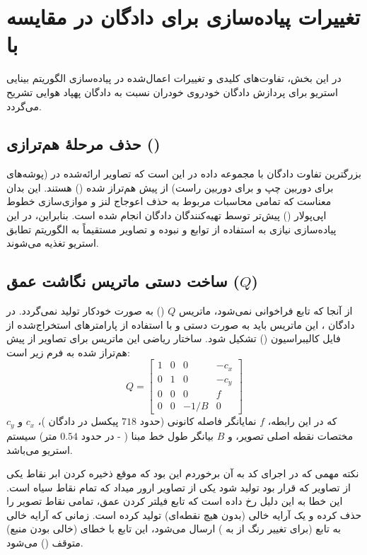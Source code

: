 \documentclass[12pt,a4paper]{article}
\begin{document}
\section{تغییرات پیاده‌سازی برای دادگان  در مقایسه با }	در این بخش، تفاوت‌های کلیدی و تغییرات اعمال‌شده در پیاده‌سازی الگوریتم بینایی استریو برای پردازش دادگان خودروی خودران  نسبت به دادگان پهپاد هوایی  تشریح می‌گردد.
	
\subsection{حذف مرحلهٔ هم‌ترازی ()}	بزرگترین تفاوت دادگان  با مجموعه داده  در این است که تصاویر ارائه‌شده در  (پوشه‌های  برای دوربین چپ و  برای دوربین راست) از پیش هم‌تراز شده () هستند. این بدان معناست که تمامی محاسبات مربوط به حذف اعوجاج لنز و موازی‌سازی خطوط اپی‌پولار () پیش‌تر توسط تهیه‌کنندگان دادگان انجام شده است. بنابراین، در این پیاده‌سازی نیازی به استفاده از توابع  و  نبوده و تصاویر مستقیماً به الگوریتم تطابق استریو تغذیه می‌شوند.
	
\subsection{ساخت دستی ماتریس نگاشت عمق ($Q$)}	از آنجا که تابع  فراخوانی نمی‌شود، ماتریس $Q$ () به صورت خودکار تولید نمی‌گردد. در دادگان ، این ماتریس باید به صورت دستی و با استفاده از پارامترهای استخراج‌شده از فایل کالیبراسیون () تشکیل شود. ساختار ریاضی این ماتریس برای تصاویر از پیش هم‌تراز شده به فرم زیر است:
	\begin{equation}
	Q = \begin{bmatrix} 
		1 & 0 & 0 & -c_x \\ 
		0 & 1 & 0 & -c_y \\ 
		0 & 0 & 0 & f \\ 
		0 & 0 & -1/B & 0 
	\end{bmatrix}
\end{equation}	که در این رابطه، $f$ نمایانگر فاصله کانونی (حدود $718$ پیکسل در دادگان )، $c_x$ و $c_y$ مختصات نقطه اصلی تصویر، و $B$ بیانگر طول خط مبنا ( - در حدود $0.54$ متر) سیستم استریو می‌باشد.

	نکته مهمی که در اجرای کد به آن برخوردم این بود که موقع ذخیره کردن ابر نقاط یکی از تصاویر که قرار بود تولید شود یکی از تصاویر ارور میداد که تمام نقاط سیاه است. این خطا به این دلیل رخ داده است که تابع فیلتر کردن عمق، تمامی نقاط تصویر را حذف کرده و یک آرایه خالی (بدون هیچ نقطه‌ای) تولید کرده است. زمانی که آرایه خالی به تابع  (برای تغییر رنگ از  به ) ارسال می‌شود، این تابع با خطای  (خالی بودن منبع) متوقف () می‌شود.
	
\end{document}

